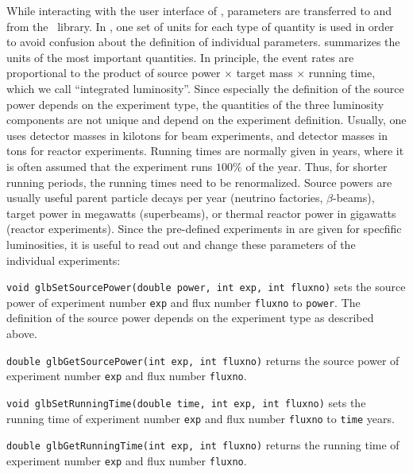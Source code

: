 While interacting with the user interface of \GLOBES , parameters are transferred to and from the \GLOBES\ library. In \GLOBES , one set of units 
for each type of quantity is used in order to avoid confusion about the definition of individual parameters.  summarizes the units of the most important quantities. In principle, the event rates are
proportional to the product of source power $\times$ target mass $\times$
 running time, which we call ``integrated luminosity''. Since especially the
 definition of the source power depends on the experiment type, the quantities of the three luminosity components
 are not unique and depend on the experiment definition. Usually,
 one uses detector masses in kilotons for beam experiments,
 and detector masses in tons for reactor experiments. Running times
 are normally given in years, where it is often assumed that the 
 experiment runs $100\%$ of the year. Thus, for shorter running periods,
 the running times need to be renormalized. Source powers are
 usually useful parent particle decays per year (neutrino factories,
 $\beta$-beams), target power in megawatts (superbeams), or thermal
 reactor power in gigawatts (reactor experiments).
%
Since the pre-defined experiments in  are given for specfific luminosities, it is useful to read out and change these
 parameters of the individual experiments:
\begin{function}
{\tt void glbSetSourcePower(double power, int exp, int fluxno)}
 sets the source power of experiment number {\tt exp} and flux number
 {\tt fluxno} to {\tt power}. The definition of the source power depends on the experiment type as described above.
\end{function}
\begin{function}
{\tt double glbGetSourcePower(int exp, int fluxno)}
 returns the source power of experiment number {\tt exp} and flux number
 {\tt fluxno}. 
\end{function}
\begin{function}
{\tt void glbSetRunningTime(double time, int exp, int fluxno)}
 sets the running time of experiment number {\tt exp} and flux number
 {\tt fluxno} to {\tt time} years.
\end{function}
\begin{function}
{\tt double glbGetRunningTime(int exp, int fluxno)}
 returns the running time of experiment number {\tt exp} and flux number
 {\tt fluxno}.
\end{function}
